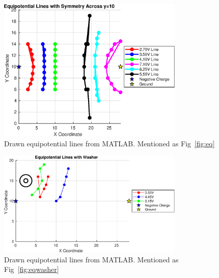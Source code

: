 \documentclass[11pt]{article}
\begin{document}
\begin{figure}[H]
\centering
\includegraphics[width=0.8\textwidth]{./images/EquipotentialLines.eps}
\caption{Drawn equipotential lines from MATLAB. Mentioned as Fig~\ref{fig:eq}}
\end{figure}

\begin{figure}[H]
\centering
\includegraphics[width=0.8\textwidth]{./images/EquipotentialLinesWithWasher.eps}
\caption{Drawn equipotential lines from MATLAB. Mentioned as Fig~\ref{fig:eqwasher}}
\end{figure}
\end{document}
